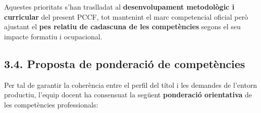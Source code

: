 \documentclass[
  paper=a4,
  ,captions=tableheading
]{scrartcl}
\begin{document}
Aquestes prioritats s'han traslladat al \textbf{desenvolupament
metodològic i curricular} del present PCCF, tot mantenint el marc
competencial oficial però ajustant el \textbf{pes relatiu de cadascuna
de les competències} segons el seu impacte formatiu i ocupacional.

\hypertarget{proposta-de-ponderaciuxf3-de-competuxe8ncies}{%
\subsection{3.4. Proposta de ponderació de
competències}\label{proposta-de-ponderaciuxf3-de-competuxe8ncies}}

Per tal de garantir la coherència entre el perfil del títol i les
demandes de l'entorn productiu, l'equip docent ha consensuat la següent
\textbf{ponderació orientativa} de les competències professionals:
\end{document}
